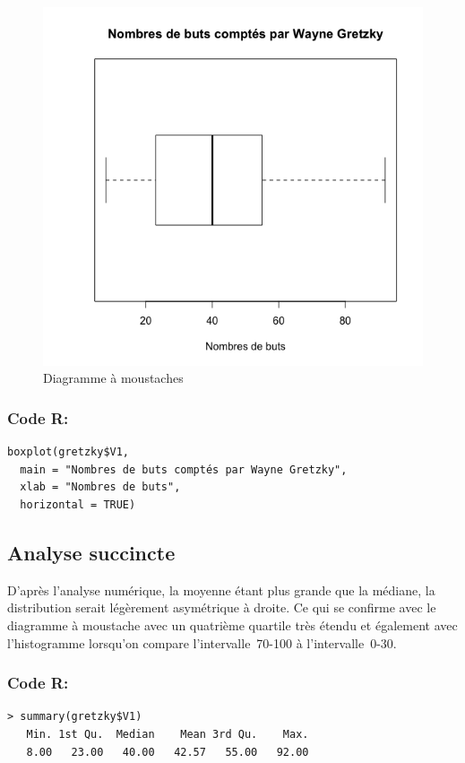 \documentclass[10pt,twocolumn]{article}
\begin{document}
\begin{figure}[htbp]
	\caption{Diagramme à moustaches}
	\label{gretzkyBoxplot}
	\centering
	\includegraphics[width=\linewidth]{d1_gretzkyBoxplot}
\end{figure}

\subsubsection*{Code R:}
\begin{verbatim}
boxplot(gretzky$V1,
  main = "Nombres de buts comptés par Wayne Gretzky",
  xlab = "Nombres de buts",
  horizontal = TRUE)
\end{verbatim}


\subsection{Analyse succincte}
D’après l’analyse numérique, la moyenne étant plus grande que la médiane, la distribution serait légèrement asymétrique à droite. Ce qui se confirme avec le diagramme à moustache avec un quatrième quartile très étendu et également avec l’histogramme lorsqu’on compare l’intervalle~70-100 à l’intervalle~0-30.

\subsubsection*{Code R:}
\begin{verbatim}
> summary(gretzky$V1)
   Min. 1st Qu.  Median    Mean 3rd Qu.    Max. 
   8.00   23.00   40.00   42.57   55.00   92.00
\end{verbatim}
\end{document}
